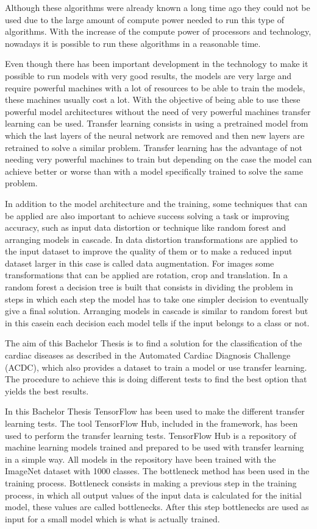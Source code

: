 \documentclass[12pt,a4paper]{article}
\begin{document}
Although these algorithms were already known a long time ago they could not be used due to the large amount of compute power needed to run this type of algorithms. With the increase of the compute power of processors and technology, nowadays it is possible to run these algorithms in a reasonable time.
\bigskip

Even though there has been important development in the technology to make it possible to run models with very good results, the models are very large and require powerful machines with a lot of resources to be able to train the models, these machines usually cost a lot. With the objective of being able to use these powerful model architectures without the need of very powerful machines transfer learning can be used. Transfer learning consists in using a pretrained model from which the last layers of the neural network are removed and then new layers are retrained to solve a similar problem. Transfer learning has the advantage of not needing very powerful machines to train but depending on the case the model can achieve better or worse than with a model specifically trained to solve the same problem.
\bigskip

In addition to the model architecture and the training, some techniques that can be applied are also important to achieve success solving a task or improving accuracy, such as input data distortion or technique like random forest and arranging models in cascade. In data distortion transformations are applied to the input dataset to improve the quality of them or to make a reduced input dataset larger in this case is called data augmentation. For images some transformations that can be applied are rotation, crop and translation. In a random forest a decision tree is built that consists in dividing the problem in steps in which each step the model has to take one simpler decision to eventually give a final solution. Arranging models in cascade is similar to random forest but in this casein each decision each model tells if the input belongs to a class or not.
\bigskip

The aim of this Bachelor Thesis is to find a solution for the classification of the cardiac diseases as described in the Automated Cardiac Diagnosis Challenge (ACDC), which also provides a dataset to train a model or use transfer learning. The procedure to achieve this is doing different tests to find the best option that yields the best results.
\bigskip

In this Bachelor Thesis TensorFlow has been used to make the different transfer learning tests. The tool TensorFlow Hub, included in the framework, has been used to perform the transfer learning tests. TensorFlow Hub is a repository of machine learning models trained and prepared to be used with transfer learning in a simple way. All models in the repository have been trained with the ImageNet dataset with 1000 classes. The bottleneck method has been used in the training process. Bottleneck consists in making a previous step in the training process, in which all output values of the input data is calculated for the initial model, these values are called bottlenecks. After this step bottlenecks are used as input for a small model which is what is actually trained.
\bigskip
\end{document}
